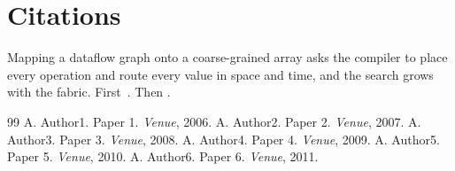 \documentclass{article}
\begin{document}
\section{Citations}
Mapping a dataflow graph onto a coarse-grained array asks the compiler to place every operation and route every value in space and time, and the search grows with the fabric. First~\citep{k01,k03,k05}. Then \citet{k04}.

\begin{thebibliography}{99}
 A. Author1. Paper 1. \emph{Venue}, 2006.
 A. Author2. Paper 2. \emph{Venue}, 2007.
 A. Author3. Paper 3. \emph{Venue}, 2008.
 A. Author4. Paper 4. \emph{Venue}, 2009.
 A. Author5. Paper 5. \emph{Venue}, 2010.
 A. Author6. Paper 6. \emph{Venue}, 2011.
\end{thebibliography}
\end{document}
